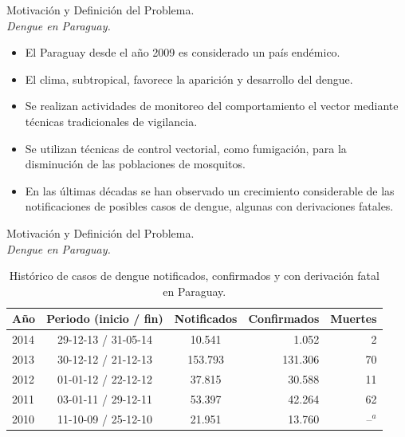 \begin{frame}[t]{Motivación y Definición del Problema.\\\textit{Dengue en Paraguay.}}
  \begin{center}
    \begin{itemize}
    \item El Paraguay desde el año 2009 es considerado un país endémico.

    \item El clima, subtropical, favorece la aparición y desarrollo del dengue.

    \item Se realizan actividades de monitoreo del comportamiento el vector mediante técnicas tradicionales de vigilancia.

    \item Se utilizan técnicas de control vectorial, como fumigación, para la disminución de las poblaciones de mosquitos.

    \item En las últimas décadas se han observado un crecimiento considerable de las notificaciones de posibles casos de dengue, algunas con derivaciones fatales.
    \end{itemize}
  \end{center}
\end{frame}


\begin{frame}[t]{Motivación y Definición del Problema.\\\textit{Dengue en Paraguay.}}
  \begin{center}
  \begin{table}
      \begin{minipage}{\textwidth}
          \begin{center}
          \caption{Histórico de casos de dengue notificados, confirmados y con derivación fatal en Paraguay.}
          \begin{tabular}{l c c r r}
              \hline
              Año & Periodo (inicio / fin) & Notificados & Confirmados & Muertes\\
              \hline
              \hline
              2014 & 29-12-13 / 31-05-14 & 10.541 & 1.052 & 2\\
              2013 & 30-12-12 / 21-12-13 & 153.793 & 131.306 & 70\\
              2012 & 01-01-12 / 22-12-12 & 37.815 & 30.588 & 11\\
              2011 & 03-01-11 / 29-12-11 & 53.397 & 42.264 & 62\\
              2010 & 11-10-09 / 25-12-10 & 21.951 & 13.760 & --$^a$
          \end{tabular}
          \end{center}
      \end{minipage}
  \end{table}
  \end{center}
\end{frame}

